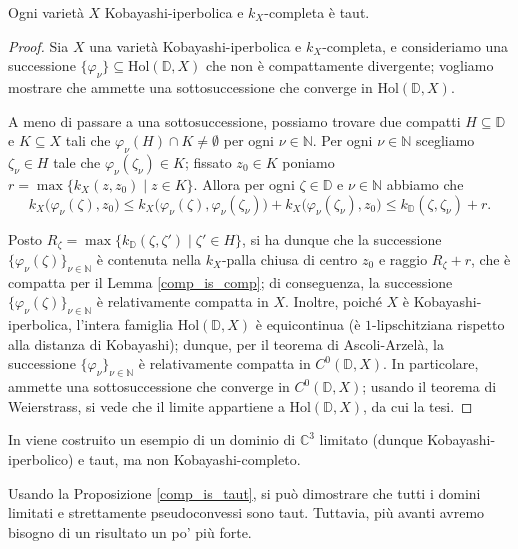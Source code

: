 \begin{prop} \label{comp_is_taut}
    Ogni varietà $X$ Kobayashi-iperbolica e $k_X$-completa è taut.
\end{prop}

\begin{proof}
    Sia $X$ una varietà Kobayashi-iperbolica e $k_X$-completa, e consideriamo una successione $\{\varphi_\nu\}\subseteq\text{Hol}(\mathbb{D},X)$ che non è compattamente divergente; vogliamo mostrare che ammette una sottosuccessione che converge in $\text{Hol}(\mathbb{D},X)$.

    A meno di passare a una sottosuccessione, possiamo trovare due compatti $H\subseteq\mathbb{D}$ e $K\subseteq X$ tali che $\varphi_\nu(H)\cap K\not=\emptyset$ per ogni $\nu\in\mathbb{N}$. Per ogni $\nu\in\mathbb{{N}}$ scegliamo $\zeta_\nu\in H$ tale che $\varphi_\nu(\zeta_\nu)\in K$; fissato $z_0\in K$ poniamo $r=\max\{k_X(z,z_0)\mid z\in K\}$. Allora per ogni $\zeta\in\mathbb{D}$ e $\nu\in\mathbb{N}$ abbiamo che
    $$k_X\big(\varphi_\nu(\zeta),z_0\big) \le k_X\big(\varphi_\nu(\zeta),\varphi_\nu(\zeta_\nu)\big)+k_X\big(\varphi_\nu(\zeta_\nu),z_0\big) \le k_{\mathbb{D}} (\zeta,\zeta_\nu)+r.$$

    Posto $R_\zeta=\max\{k_{\mathbb{D}}(\zeta,\zeta')\mid \zeta'\in H\}$, si ha dunque che la successione $\{\varphi_\nu(\zeta)\}_{\nu\in\mathbb{N}}$ è contenuta nella $k_X$-palla chiusa di centro $z_0$ e raggio $R_\zeta+r$, che è compatta per il Lemma \ref{comp_is_comp}; di conseguenza, la successione $\{\varphi_\nu(\zeta)\}_{\nu\in\mathbb{N}}$ è relativamente compatta in $X$. Inoltre, poiché $X$ è Kobayashi-iperbolica, l'intera famiglia $\text{Hol}(\mathbb{D},X)$ è equicontinua (è $1$-lipschitziana rispetto alla distanza di Kobayashi); dunque, per il teorema di Ascoli-Arzelà, la successione $\{\varphi_\nu\}_{\nu\in\mathbb{N}}$ è relativamente compatta in $C^0(\mathbb{D},X)$. In particolare, ammette una sottosuccessione che converge in $C^0(\mathbb{D},X)$; usando il teorema di Weierstrass, si vede che il limite appartiene a $\text{Hol}(\mathbb{D},X)$, da cui la tesi.
\end{proof}

\begin{ex}
    In \cite{Rosa} viene costruito un esempio di un dominio di $\mathbb{C}^3$ limitato (dunque Kobayashi-iperbolico) e taut, ma non Kobayashi-completo.
\end{ex}

Usando la Proposizione \ref{comp_is_taut}, si può dimostrare che tutti i domini limitati e strettamente pseudoconvessi sono taut. Tuttavia, più avanti avremo bisogno di un risultato un po' più forte.


